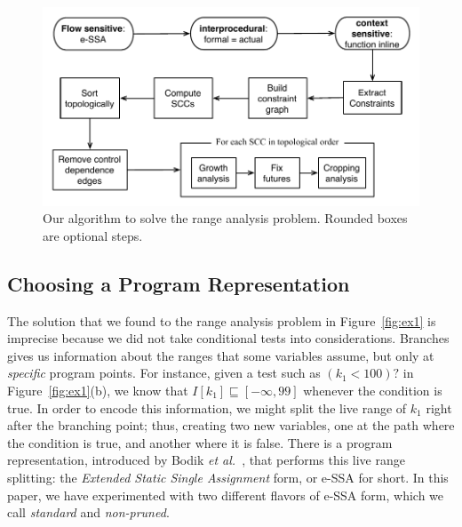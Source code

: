 \documentclass[preprint]{sigplanconf}
\begin{document}
\begin{figure}[t!]
\begin{center}
\includegraphics[width=\columnwidth]{images/algorithm}
\end{center}
\caption{\label{fig:algorithm}
Our algorithm to solve the range analysis problem.
Rounded boxes are optional steps.}
\end{figure}

\subsection{Choosing a Program Representation}
\label{sub:rep}

The solution that we found to the range analysis problem in Figure~\ref{fig:ex1}
is imprecise because we did not take conditional tests into considerations.
Branches gives us information about the ranges that some variables assume, but
only at {\em specific} program points.
For instance, given a test such as $(k_1 < 100)?$ in  Figure~\ref{fig:ex1}(b),
we know that $I[k_1] \sqsubseteq [-\infty, 99]$ whenever the condition is true.
In order to encode this information, we might split the live range of $k_1$
right after the branching point; thus, creating two new variables, one at the
path where the condition is true, and another where it is false.
There is a program representation, introduced by Bodik
{\em et al.}~\cite{Bodik00}, that performs this live range splitting:
the {\em Extended Static Single Assignment} form, or e-SSA for short.
In this paper, we have experimented with two different flavors of e-SSA form,
which we call {\em standard} and {\em non-pruned}.
\end{document}

